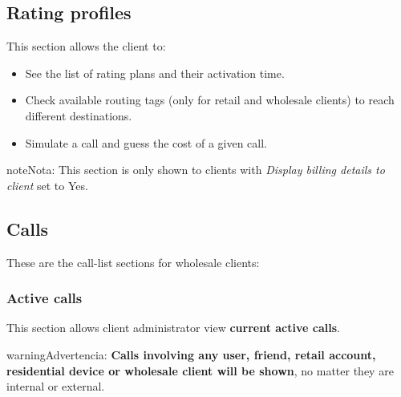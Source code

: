 \documentclass[letterpaper,10pt,spanish]{sphinxmanual}
\begin{document}
\subsection{Rating profiles}
\label{administration_portal/client/wholesale/rating_profiles:rating-profiles}\label{administration_portal/client/wholesale/rating_profiles::doc}
This section allows the client to:
\begin{itemize}
\item {} 
See the list of rating plans and their activation time.

\item {} 
Check available routing tags (only for retail and wholesale clients) to reach different destinations.

\item {} 
Simulate a call and guess the cost of a given call.

\end{itemize}

\begin{notice}{note}{Nota:}
This section is only shown to clients with \emph{Display billing details to client} set to Yes.
\end{notice}


\subsection{Calls}
\label{administration_portal/client/wholesale/calls/index::doc}\label{administration_portal/client/wholesale/calls/index:calls}
These are the call-list sections for wholesale clients:


\subsubsection{Active calls}
\label{administration_portal/client/wholesale/calls/active_calls::doc}\label{administration_portal/client/wholesale/calls/active_calls:active-calls}
This section allows client administrator view \textbf{current active calls}.

\begin{notice}{warning}{Advertencia:}
\textbf{Calls involving any user, friend, retail account, residential device or wholesale client will be shown},
no matter they are internal or external.
\end{notice}
\end{document}
